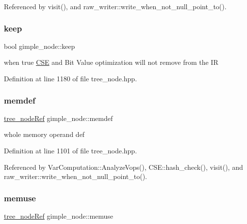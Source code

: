 Referenced by visit(), and raw\+\_\+writer\+::write\+\_\+when\+\_\+not\+\_\+null\+\_\+point\+\_\+to().

\mbox{\label{structgimple__node_a48e4239379d64efd883b9ba8aeb0c904}} 
\subsubsection{\texorpdfstring{keep}{keep}}
{\footnotesize\ttfamily bool gimple\+\_\+node\+::keep}



when true \hyperlink{classCSE}{C\+SE} and Bit Value optimization will not remove from the IR 



Definition at line 1180 of file tree\+\_\+node.\+hpp.

\mbox{\label{structgimple__node_a5fe65e3ba8c8a4041353a23a35aea9fc}} 
\subsubsection{\texorpdfstring{memdef}{memdef}}
{\footnotesize\ttfamily \hyperlink{tree__node_8hpp_a6ee377554d1c4871ad66a337eaa67fd5}{tree\+\_\+node\+Ref} gimple\+\_\+node\+::memdef}



whole memory operand def 



Definition at line 1101 of file tree\+\_\+node.\+hpp.



Referenced by Var\+Computation\+::\+Analyze\+Vops(), C\+S\+E\+::hash\+\_\+check(), visit(), and raw\+\_\+writer\+::write\+\_\+when\+\_\+not\+\_\+null\+\_\+point\+\_\+to().

\mbox{\label{structgimple__node_a8062a53f620774c742783020b76c6455}} 
\subsubsection{\texorpdfstring{memuse}{memuse}}
{\footnotesize\ttfamily \hyperlink{tree__node_8hpp_a6ee377554d1c4871ad66a337eaa67fd5}{tree\+\_\+node\+Ref} gimple\+\_\+node\+::memuse}



